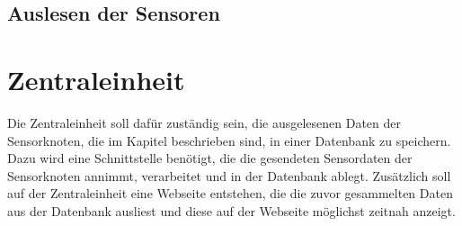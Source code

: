 \subsection{Auslesen der Sensoren}
\section{Zentraleinheit}
Die Zentraleinheit soll dafür zuständig sein, die ausgelesenen Daten der Sensorknoten, die im Kapitel  beschrieben sind, in einer Datenbank zu speichern. Dazu wird eine Schnittstelle benötigt, die die gesendeten Sensordaten der Sensorknoten annimmt, verarbeitet und in der Datenbank ablegt. Zusätzlich soll auf der Zentraleinheit eine Webseite entstehen, die die zuvor gesammelten Daten aus der Datenbank ausliest und diese auf der Webseite möglichst zeitnah anzeigt.
